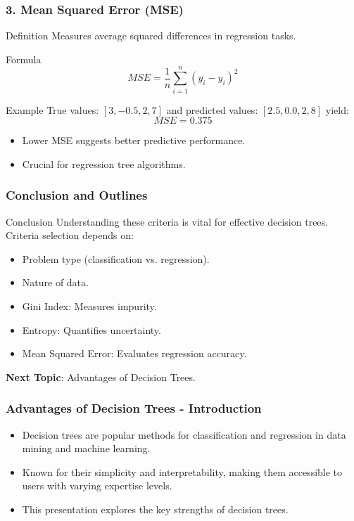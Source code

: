\documentclass[aspectratio=169]{beamer}
\begin{document}
\begin{frame}[fragile]
    \frametitle{3. Mean Squared Error (MSE)}
    \begin{block}{Definition}
        Measures average squared differences in regression tasks.
    \end{block}
    \begin{block}{Formula}
        \begin{equation}
            MSE = \frac{1}{n} \sum_{i=1}^{n} (y_i - \hat{y}_i)^2 
        \end{equation}
    \end{block}
    \begin{block}{Example}
        True values: $[3, -0.5, 2, 7]$ and predicted values: $[2.5, 0.0, 2, 8]$ yield:
        \begin{equation}
            MSE = 0.375
        \end{equation}
    \end{block}
    \begin{itemize}
        \item Lower MSE suggests better predictive performance.
        \item Crucial for regression tree algorithms.
    \end{itemize}
\end{frame}

\begin{frame}[fragile]
    \frametitle{Conclusion and Outlines}
    \begin{block}{Conclusion}
        Understanding these criteria is vital for effective decision trees. Criteria selection depends on:
        \begin{itemize}
            \item Problem type (classification vs. regression).
            \item Nature of data.
        \end{itemize}
    \end{block}
    \begin{itemize}
        \item Gini Index: Measures impurity.
        \item Entropy: Quantifies uncertainty.
        \item Mean Squared Error: Evaluates regression accuracy.
    \end{itemize}
    \pause
    \textbf{Next Topic}: Advantages of Decision Trees.
\end{frame}

\begin{frame}[fragile]
    \frametitle{Advantages of Decision Trees - Introduction}
    \begin{itemize}
        \item Decision trees are popular methods for classification and regression in data mining and machine learning.
        \item Known for their simplicity and interpretability, making them accessible to users with varying expertise levels.
        \item This presentation explores the key strengths of decision trees.
    \end{itemize}
\end{frame}
\end{document}
